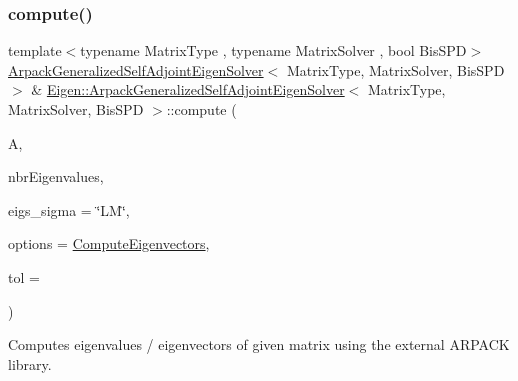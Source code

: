 \subsubsection{\texorpdfstring{compute()}{compute()}\hspace{0.1cm}{\footnotesize\ttfamily [3/4]}}
{\footnotesize\ttfamily template$<$typename Matrix\+Type , typename Matrix\+Solver , bool Bis\+S\+PD$>$ \\
\hyperlink{class_eigen_1_1_arpack_generalized_self_adjoint_eigen_solver}{Arpack\+Generalized\+Self\+Adjoint\+Eigen\+Solver}$<$ Matrix\+Type, Matrix\+Solver, Bis\+S\+PD $>$ \& \hyperlink{class_eigen_1_1_arpack_generalized_self_adjoint_eigen_solver}{Eigen\+::\+Arpack\+Generalized\+Self\+Adjoint\+Eigen\+Solver}$<$ Matrix\+Type, Matrix\+Solver, Bis\+S\+PD $>$\+::compute (\begin{DoxyParamCaption}\item[{const Matrix\+Type \&}]{A,  }\item[{Index}]{nbr\+Eigenvalues,  }\item[{std\+::string}]{eigs\+\_\+sigma = {\ttfamily \char`\"{}LM\char`\"{}},  }\item[{int}]{options = {\ttfamily \hyperlink{group__enums_ggae3e239fb70022eb8747994cf5d68b4a9ada93d8885bde32b876ba4af01d3292cc}{Compute\+Eigenvectors}},  }\item[{\hyperlink{class_eigen_1_1_arpack_generalized_self_adjoint_eigen_solver_a2555af55e53bf9de894a49e639be2e1e}{Real\+Scalar}}]{tol = {} }\end{DoxyParamCaption})}



Computes eigenvalues / eigenvectors of given matrix using the external A\+R\+P\+A\+CK library. 


